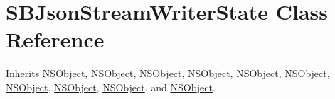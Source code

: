 \hypertarget{interface_s_b_json_stream_writer_state}{
\section{\-S\-B\-Json\-Stream\-Writer\-State \-Class \-Reference}
\label{interface_s_b_json_stream_writer_state}
}


\-Inherits \hyperlink{class_n_s_object}{\-N\-S\-Object}, \hyperlink{class_n_s_object}{\-N\-S\-Object}, \hyperlink{class_n_s_object}{\-N\-S\-Object}, \hyperlink{class_n_s_object}{\-N\-S\-Object}, \hyperlink{class_n_s_object}{\-N\-S\-Object}, \hyperlink{class_n_s_object}{\-N\-S\-Object}, \hyperlink{class_n_s_object}{\-N\-S\-Object}, \hyperlink{class_n_s_object}{\-N\-S\-Object}, \hyperlink{class_n_s_object}{\-N\-S\-Object}, and \hyperlink{class_n_s_object}{\-N\-S\-Object}.



